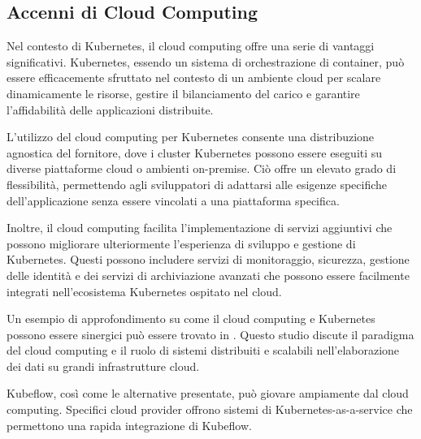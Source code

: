 % 
% 
% 



\subsection{Accenni di Cloud Computing}

Nel contesto di Kubernetes, il cloud computing offre una serie di vantaggi significativi. Kubernetes, essendo un sistema di orchestrazione di container, può essere efficacemente sfruttato nel contesto di un ambiente cloud per scalare dinamicamente le risorse, gestire il bilanciamento del carico e garantire l'affidabilità delle applicazioni distribuite.

L'utilizzo del cloud computing per Kubernetes consente una distribuzione agnostica del fornitore, dove i cluster Kubernetes possono essere eseguiti su diverse piattaforme cloud o ambienti on-premise. Ciò offre un elevato grado di flessibilità, permettendo agli sviluppatori di adattarsi alle esigenze specifiche dell'applicazione senza essere vincolati a una piattaforma specifica.

Inoltre, il cloud computing facilita l'implementazione di servizi aggiuntivi che possono migliorare ulteriormente l'esperienza di sviluppo e gestione di Kubernetes. Questi possono includere servizi di monitoraggio, sicurezza, gestione delle identità e dei servizi di archiviazione avanzati che possono essere facilmente integrati nell'ecosistema Kubernetes ospitato nel cloud.

Un esempio di approfondimento su come il cloud computing e Kubernetes possono essere sinergici può essere trovato in \cite{armbrust2010view}. Questo studio discute il paradigma del cloud computing e il ruolo di sistemi distribuiti e scalabili nell'elaborazione dei dati su grandi infrastrutture cloud.

Kubeflow, così come le alternative presentate, può giovare ampiamente dal cloud computing. Specifici cloud provider offrono sistemi di Kubernetes-as-a-service che permettono una rapida integrazione di Kubeflow.

